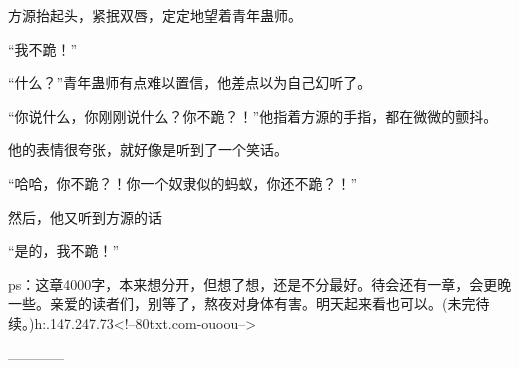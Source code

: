 \begin{this_body}
方源抬起头，紧抿双唇，定定地望着青年蛊师。

“我不跪！”

“什么？”青年蛊师有点难以置信，他差点以为自己幻听了。

“你说什么，你刚刚说什么？你不跪？！”他指着方源的手指，都在微微的颤抖。

他的表情很夸张，就好像是听到了一个笑话。

“哈哈，你不跪？！你一个奴隶似的蚂蚁，你还不跪？！”

然后，他又听到方源的话

“是的，我不跪！”

ps：这章4000字，本来想分开，但想了想，还是不分最好。待会还有一章，会更晚一些。亲爱的读者们，别等了，熬夜对身体有害。明天起来看也可以。(未完待续。)h:.147.247.73<!--80txt.com-ouoou-->

------------

\end{this_body}

